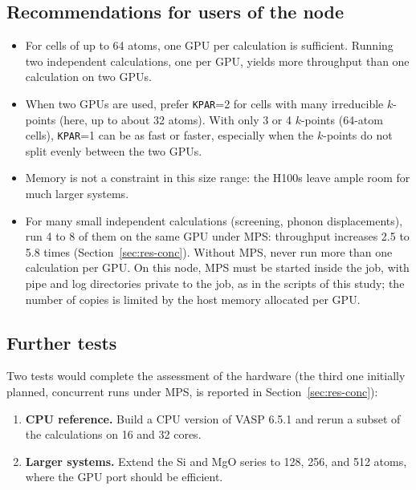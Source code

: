 \documentclass[11pt,letterpaper]{article}
\begin{document}
\subsection{Recommendations for users of the node}
\label{sec:disc-recommendations}

\begin{itemize}
  \item For cells of up to 64 atoms, one GPU per calculation is sufficient. Running two
        independent calculations, one per GPU, yields more throughput than one calculation on
        two GPUs.
  \item When two GPUs are used, prefer \texttt{KPAR}=2 for cells with many irreducible
        $k$-points (here, up to about 32 atoms). With only 3 or 4 $k$-points (64-atom cells),
        \texttt{KPAR}=1 can be as fast or faster, especially when the $k$-points do not split
        evenly between the two GPUs.
  \item Memory is not a constraint in this size range: the H100s leave ample room for much
        larger systems.
  \item For many small independent calculations (screening, phonon displacements), run 4 to 8
        of them on the same GPU under MPS: throughput increases 2.5 to 5.8 times
        (Section~\ref{sec:res-conc}). Without MPS, never run more than one calculation per GPU.
        On this node, MPS must be started inside the job, with pipe and log directories private
        to the job, as in the scripts of this study; the number of copies is limited by the
        host memory allocated per GPU.
\end{itemize}

\subsection{Further tests}
\label{sec:disc-further}

Two tests would complete the assessment of the hardware (the third one initially planned,
concurrent runs under MPS, is reported in Section~\ref{sec:res-conc}):
\begin{enumerate}
  \item \textbf{CPU reference.} Build a CPU version of VASP 6.5.1 and rerun a subset of the
        calculations on 16 and 32 cores.
  \item \textbf{Larger systems.} Extend the Si and MgO series to 128, 256, and 512 atoms, where
        the GPU port should be efficient.
\end{enumerate}
\end{document}

